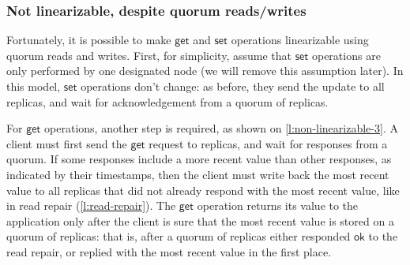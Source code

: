 \begin{frame}
    \label{s:non-linearizable-2}
    \frametitle{Not linearizable, despite quorum reads/writes}
\end{frame}
\label{l:non-linearizable-2}

Fortunately, it is possible to make $\mathsf{get}$ and $\mathsf{set}$ operations linearizable using quorum reads and writes.
First, for simplicity, assume that $\mathsf{set}$ operations are only performed by one designated node (we will remove this assumption later).
In this model, $\mathsf{set}$ operations don't change: as before, they send the update to all replicas, and wait for acknowledgement from a quorum of replicas.

For $\mathsf{get}$ operations, another step is required, as shown on \autoref{l:non-linearizable-3}.
A client must first send the $\mathsf{get}$ request to replicas, and wait for responses from a quorum.
If some responses include a more recent value than other responses, as indicated by their timestamps, then the client must write back the most recent value to all replicas that did not already respond with the most recent value, like in read repair (\autoref{l:read-repair}).
The $\mathsf{get}$ operation returns its value to the application only after the client is sure that the most recent value is stored on a quorum of replicas: that is, after a quorum of replicas either responded $\mathsf{ok}$ to the read repair, or replied with the most recent value in the first place.

